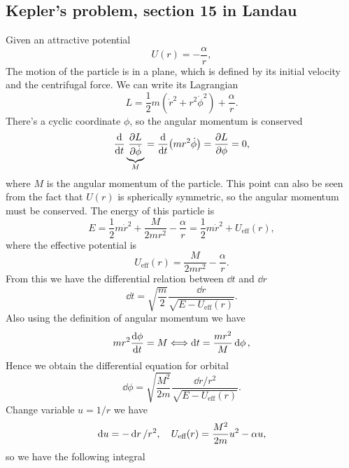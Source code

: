 \documentclass[10pt]{article}
\begin{document}
\subsection{Kepler's problem, section 15 in Landau}
Given an attractive potential
\begin{equation}
	U(r) = -\frac{\alpha}{r},
\end{equation}
The motion of the particle is in a plane, which is defined by its initial velocity and the centrifugal force. We can write its Lagrangian
\begin{equation}
	L = \frac{1}{2} m (\dot{r}^2 + r^2 \dot{\phi}^2) + \frac{\alpha}{r}.
\end{equation}
There's a cyclic coordinate $\phi$, so the angular momentum is conserved
\begin{equation}
	\dv{t} \underbrace{\pdv{L}{\dot{\phi}}}_{M} = \dv{t}(m r^2 \dot{\phi}) = \pdv{L}{\phi} = 0,
\end{equation}
where $M$ is the angular momentum of the particle. This point can also be seen from the fact that $U(r)$ is spherically symmetric, so the angular momentum must be conserved.
The energy of this particle is
\begin{equation}
	E = \frac{1}{2} m \dot{r}^2 + \frac{M}{2m r^2} - \frac{\alpha}{r} = \frac{1}{2} m \dot{r}^2 + U_{\text{eff}}(r),
\end{equation}
where the effective potential is
\begin{equation}
	U_{\text{eff}}(r) = \frac{M}{2m r^2} - \frac{\alpha}{r}.
\end{equation}
From this we have the differential relation between $\dd{t}$ and $\dd{r}$
\begin{equation}
	\dd{t} = \sqrt{\frac{m}{2}} \frac{\dd{r}}{\sqrt{E - U_{\text{eff}}(r)}}.
\end{equation}
Also using the definition of angular momentum we have
\begin{equation}
	m r^2 \dv{\phi}{t} = M \Longleftrightarrow \dd{t} = \frac{m r^2}{M} \dd{\phi},
\end{equation}
Hence we obtain the differential equation for orbital
\begin{equation}
	\dd{\phi} = \sqrt{\frac{M^2}{2m}} \frac{\dd{r}/r^2}{\sqrt{E - U_{\text{eff}}(r)}}.
\end{equation}
Change variable $u = 1/r$ we have
\begin{equation}
	\dd{u} = -\dd{r}/r^2\qc U_{\text{eff}}(r) = \frac{M^2}{2m} u^2 - \alpha u,
\end{equation}
so we have the following integral
\end{document}
